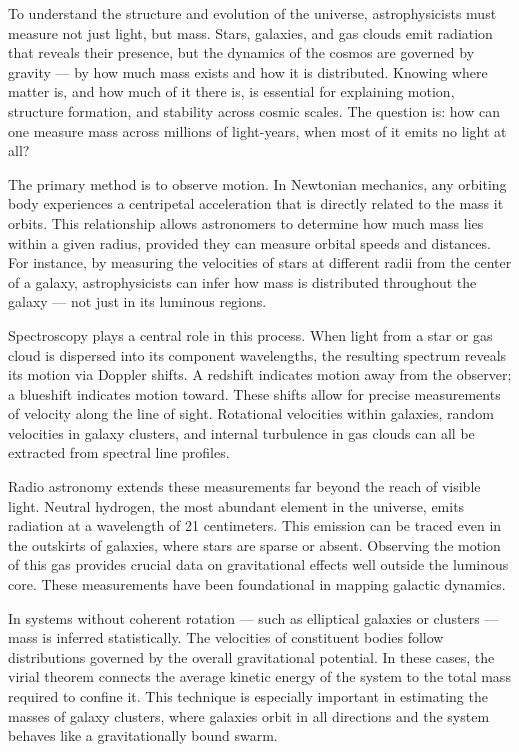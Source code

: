 To understand the structure and evolution of the universe, astrophysicists must measure not just light, but mass. Stars, galaxies, and gas clouds emit radiation that reveals their presence, but the dynamics of the cosmos are governed by gravity — by how much mass exists and how it is distributed. Knowing where matter is, and how much of it there is, is essential for explaining motion, structure formation, and stability across cosmic scales. The question is: how can one measure mass across millions of light-years, when most of it emits no light at all?

The primary method is to observe motion. In Newtonian mechanics, any orbiting body experiences a centripetal acceleration that is directly related to the mass it orbits. This relationship allows astronomers to determine how much mass lies within a given radius, provided they can measure orbital speeds and distances. For instance, by measuring the velocities of stars at different radii from the center of a galaxy, astrophysicists can infer how mass is distributed throughout the galaxy — not just in its luminous regions.

Spectroscopy plays a central role in this process. When light from a star or gas cloud is dispersed into its component wavelengths, the resulting spectrum reveals its motion via Doppler shifts. A redshift indicates motion away from the observer; a blueshift indicates motion toward. These shifts allow for precise measurements of velocity along the line of sight. Rotational velocities within galaxies, random velocities in galaxy clusters, and internal turbulence in gas clouds can all be extracted from spectral line profiles.

Radio astronomy extends these measurements far beyond the reach of visible light. Neutral hydrogen, the most abundant element in the universe, emits radiation at a wavelength of 21 centimeters. This emission can be traced even in the outskirts of galaxies, where stars are sparse or absent. Observing the motion of this gas provides crucial data on gravitational effects well outside the luminous core. These measurements have been foundational in mapping galactic dynamics.

In systems without coherent rotation — such as elliptical galaxies or clusters — mass is inferred statistically. The velocities of constituent bodies follow distributions governed by the overall gravitational potential. In these cases, the virial theorem connects the average kinetic energy of the system to the total mass required to confine it. This technique is especially important in estimating the masses of galaxy clusters, where galaxies orbit in all directions and the system behaves like a gravitationally bound swarm.

